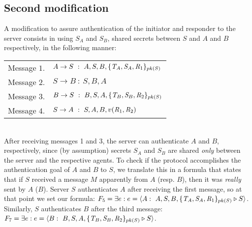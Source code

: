 \documentclass{entcs} \usepackage{entcsmacro}
\begin{document}
\subsection{Second modification} A modification to assure
authentication of the initiator and responder to the server consists in
using $S_A$ and $S_B$, shared secrets between $S$ and $A$ and $B$
respectively, in the following manner:\\

\begin{tabular}{c l}
Message $1$.&$A \rightarrow S \ : \ A,S,B, \{\emph{T}_A, \emph{S}_A, \emph{R}_1\}_{pk(S)} $ \\
Message $2$.&$S \rightarrow B \ : \ S,B,A $ \\
Message $3$.&$B \rightarrow S \ : \ B,S,A, \{\emph{T}_B, \emph{S}_B, \emph{R}_2\}_{pk(S)} $ \\
Message $4$.&$S \rightarrow A \ : \ S,A,B, v(\emph{R}_1,\emph{R}_2) $ \\
\end{tabular}\\

After receiving messages 1 and 3, the server can authenticate $A$ and
$B$, respectively, since (by assumption) secrets $S_A$ and $S_B$ are
shared \emph{only} between the server and the respective agents.  To
check if the protocol accomplishes the authentication goal of $A$ and
$B$ to $S$, we translate this in a formula that states that if $S$
received a message $M$ apparently from $A$ (resp. $B$), then it was
\emph{really} sent by $A$ ($B$).  
%
Server $S$ authenticates $A$ after receiving the first message, 
so at that point we set our formula: 
$F_5 =  \exists e: e= \langle A: \ A,S,B, \{\emph{T}_A, \emph{S}_A, \emph{R}_1\}_{pk(S)} \triangleright S  \rangle$. Similarly, $S$ authenticates $B$ after the third message: $F_7 =  \exists e: e= \langle B: \ B,S,A, \{\emph{T}_B, \emph{S}_B, \emph{R}_2\}_{pk(S)} \triangleright S  
\rangle $.
\end{document}
